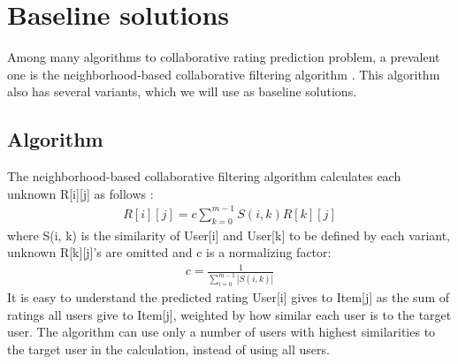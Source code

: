 \documentclass[twocolumn]{article}
\begin{document}
\section{Baseline solutions}
Among many algorithms to collaborative rating prediction problem,
a prevalent one is the neighborhood-based collaborative filtering algorithm 
\cite{su2009survey}.
This algorithm also has several variants,
which we will use as baseline solutions.

\subsection{Algorithm}
The neighborhood-based collaborative filtering algorithm calculates each 
unknown R[i][j] as 
follows \cite{su2009survey}:
\begin{align*}
R[i][j] = c \sum_{k = 0}^{m-1} S(i, k) R[k][j]
\end{align*}
where S(i, k) is the similarity of User[i] and User[k] to be defined by each 
variant,
unknown R[k][j]'s are omitted and c is a normalizing factor:
\begin{align*}
	c = \frac{1}{\sum_{l = 0}^{m - 1} |S(i, k)|}
\end{align*}
It is easy to understand the predicted rating User[i] gives to Item[j] as the 
sum of ratings all users give to Item[j],
weighted by how similar each user is to the target user.
The algorithm can use only a number of users with highest similarities to the 
target user in the calculation, instead of using all users.
\end{document}
